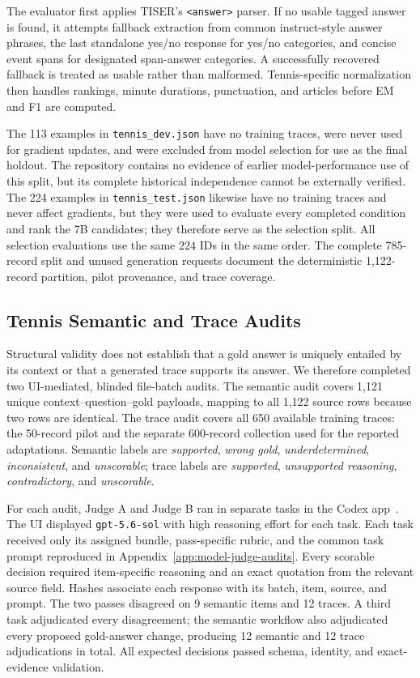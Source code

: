\documentclass[conference]{IEEEtran}
\begin{document}
The evaluator first applies TISER's \texttt{<answer>} parser. If no usable tagged answer is found, it attempts fallback extraction from common instruct-style answer phrases, the last standalone yes/no response for yes/no categories, and concise event spans for designated span-answer categories. A successfully recovered fallback is treated as usable rather than malformed. Tennis-specific normalization then handles rankings, minute durations, punctuation, and articles before EM and F1 are computed.

The 113 examples in \texttt{tennis\_dev.json} have no training traces, were never used for gradient updates, and were excluded from model selection for use as the final holdout. The repository contains no evidence of earlier model-performance use of this split, but its complete historical independence cannot be externally verified. The 224 examples in \texttt{tennis\_test.json} likewise have no training traces and never affect gradients, but they were used to evaluate every completed condition and rank the 7B candidates; they therefore serve as the selection split. All selection evaluations use the same 224 IDs in the same order. The complete 785-record split and unused generation requests document the deterministic 1,122-record partition, pilot provenance, and trace coverage.

\subsection{Tennis Semantic and Trace Audits}

Structural validity does not establish that a gold answer is uniquely entailed by its context or that a generated trace supports its answer. We therefore completed two UI-mediated, blinded file-batch audits. The semantic audit covers 1,121 unique context--question--gold payloads, mapping to all 1,122 source rows because two rows are identical. The trace audit covers all 650 available training traces: the 50-record pilot and the separate 600-record collection used for the reported adaptations. Semantic labels are \emph{supported}, \emph{wrong gold}, \emph{underdetermined}, \emph{inconsistent}, and \emph{unscorable}; trace labels are \emph{supported}, \emph{unsupported reasoning}, \emph{contradictory}, and \emph{unscorable}.

For each audit, Judge A and Judge B ran in separate tasks in the Codex app~\cite{openai2026codexapp}. The UI displayed \texttt{gpt-5.6-sol} with high reasoning effort for each task. Each task received only its assigned bundle, pass-specific rubric, and the common task prompt reproduced in Appendix~\ref{app:model-judge-audits}. Every scorable decision required item-specific reasoning and an exact quotation from the relevant source field. Hashes associate each response with its batch, item, source, and prompt. The two passes disagreed on 9 semantic items and 12 traces. A third task adjudicated every disagreement; the semantic workflow also adjudicated every proposed gold-answer change, producing 12 semantic and 12 trace adjudications in total. All expected decisions passed schema, identity, and exact-evidence validation.
\end{document}
